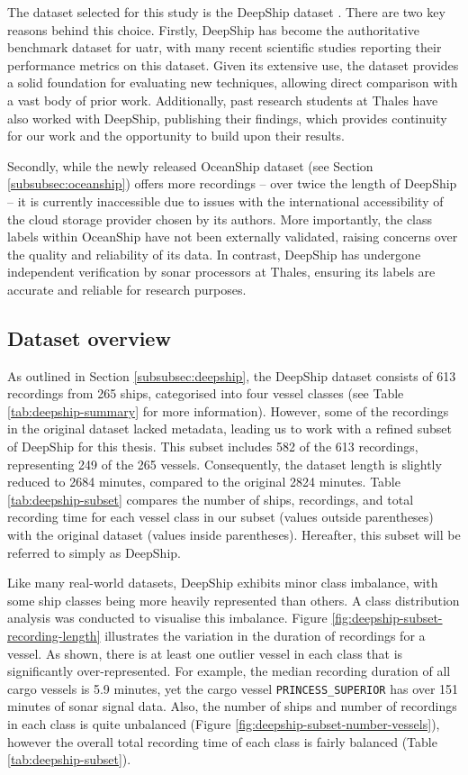 The dataset selected for this study is the DeepShip dataset \cite{irfan_deepship_2021}. There are two key reasons behind this choice. Firstly, DeepShip has become the authoritative benchmark dataset for \acrshort{uatr}, with many recent scientific studies reporting their performance metrics on this dataset. Given its extensive use, the dataset provides a solid foundation for evaluating new techniques, allowing direct comparison with a vast body of prior work. Additionally, past research students at Thales have also worked with DeepShip, publishing their findings, which provides continuity for our work and the opportunity to build upon their results.

Secondly, while the newly released OceanShip dataset (see Section \ref{subsubsec:oceanship}) offers more recordings -- over twice the length of DeepShip -- it is currently inaccessible due to issues with the international accessibility of the cloud storage provider chosen by its authors. More importantly, the class labels within OceanShip have not been externally validated, raising concerns over the quality and reliability of its data. In contrast, DeepShip has undergone independent verification by sonar processors at Thales, ensuring its labels are accurate and reliable for research purposes.

\subsection{Dataset overview}

As outlined in Section \ref{subsubsec:deepship}, the DeepShip dataset consists of 613 recordings from 265 ships, categorised into four vessel classes (see Table \ref{tab:deepship-summary} for more information). However, some of the recordings in the original dataset lacked metadata, leading us to work with a refined subset of DeepShip for this thesis. This subset includes 582 of the 613 recordings, representing 249 of the 265 vessels. Consequently, the dataset length is slightly reduced to 2684 minutes, compared to the original 2824 minutes. Table \ref{tab:deepship-subset} compares the number of ships, recordings, and total recording time for each vessel class in our subset (values outside parentheses) with the original dataset (values inside parentheses). Hereafter, this subset will be referred to simply as DeepShip.

Like many real-world datasets, DeepShip exhibits minor class imbalance, with some ship classes being more heavily represented than others. A class distribution analysis was conducted to visualise this imbalance. Figure \ref{fig:deepship-subset-recording-length} illustrates the variation in the duration of recordings for a vessel. As shown, there is at least one outlier vessel in each class that is significantly over-represented. For example, the median recording duration of all cargo vessels is 5.9 minutes, yet the cargo vessel \texttt{PRINCESS\_SUPERIOR} has over 151 minutes of sonar signal data. Also, the number of ships and number of recordings in each class is quite unbalanced (Figure \ref{fig:deepship-subset-number-vessels}), however the overall total recording time of each class is fairly balanced (Table \ref{tab:deepship-subset}).

